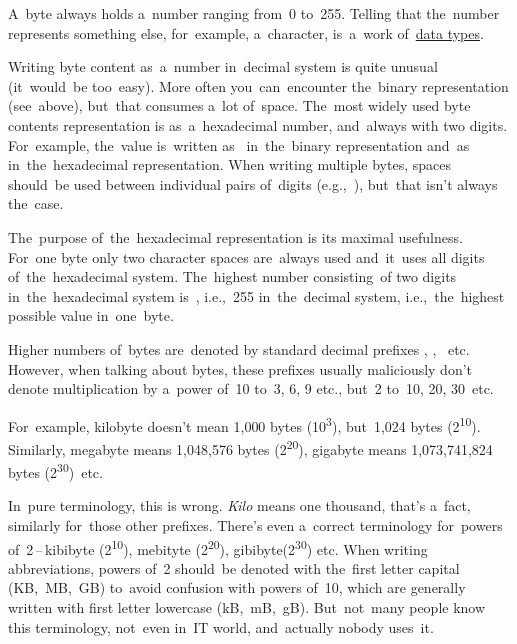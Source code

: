 \enlargethispage{20mm}
\thispagestyle{empty}
A~byte always holds a~number ranging from~0 to~255.
Telling that the~number represents something else, for~example, a~character, is~a~work of~\hyperref[datatypes]{data types}.

Writing byte content as~a~number in~decimal system is quite unusual (it~would~be too~easy).
More often you~can~encounter the~binary representation (see~above), but~that consumes a~lot of~space.
The~most widely used byte contents representation is as~a~hexadecimal number, and~always with two digits.
For~example, the~value  is~written as~ in~the~binary representation and~as~ in~the~hexadecimal representation.
When writing multiple bytes, spaces should~be used between individual pairs of~digits (e.g.,~), but~that isn't always the~case.

The~purpose of~the~hexadecimal representation is its maximal usefulness.
For~one byte only two character spaces are~always used and~it~uses all digits of~the~hexadecimal system.
The~highest number consisting~of two digits in~the~hexadecimal system is~, i.e.,~255 in~the~decimal system, i.e.,~the~highest possible value in~one~byte.
\newpage

\warningnonl Higher numbers of~bytes are~denoted by standard decimal prefixes , , ~etc.
However, when talking about bytes, these prefixes usually maliciously don't denote multiplication by a~power of~10 to~3, 6, 9 etc., but~2 to~10, 20, 30~etc.

For~example, kilobyte doesn't mean 1,000 bytes (10\textsuperscript{3}), but~1,024 bytes (2\textsuperscript{10}).
Similarly, megabyte means 1,048,576 bytes (2\textsuperscript{20}), gigabyte means 1,073,741,824 bytes (2\textsuperscript{30})~etc.

In~pure terminology, this is wrong.
\textit{Kilo} means one thousand, that's a~fact, similarly for~those other prefixes.
There's even a~correct terminology for~powers of~2\,--\,kibibyte (2\textsuperscript{10}), mebityte (2\textsuperscript{20}), gibibyte(2\textsuperscript{30}) etc.
When writing abbreviations, powers of~2 should~be denoted with the~first letter capital (KB,~MB,~GB) to~avoid confusion with powers of~10, which are generally written with first letter lowercase (kB,~mB,~gB).
But~not~many people know this terminology, not~even in~IT world, and~actually nobody uses~it.

